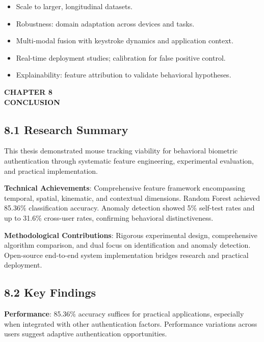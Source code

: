 \documentclass[
  11pt,
  a4paper,
]{article}
\providecommand{\tightlist}{%
  \setlength{\itemsep}{0pt}\setlength{\parskip}{0pt}}
\begin{document}
\begin{itemize}
\tightlist
\item
  Scale to larger, longitudinal datasets.
\item
  Robustness: domain adaptation across devices and tasks.
\item
  Multi-modal fusion with keystroke dynamics and application context.
\item
  Real-time deployment studies; calibration for false positive control.
\item
  Explainability: feature attribution to validate behavioral hypotheses.
\end{itemize}

\newpage
\thispagestyle{plain}

\begin{center}
\vspace*{2cm}
\textbf{\Large CHAPTER 8}\\[0.5cm]
\textbf{\Large CONCLUSION}
\end{center}

\newpage

\subsection{8.1 Research Summary}\label{research-summary}

This thesis demonstrated mouse tracking viability for behavioral
biometric authentication through systematic feature engineering,
experimental evaluation, and practical implementation.

\textbf{Technical Achievements}: Comprehensive feature framework
encompassing temporal, spatial, kinematic, and contextual dimensions.
Random Forest achieved 85.36\% classification accuracy. Anomaly
detection showed 5\% self-test rates and up to 31.6\% cross-user rates,
confirming behavioral distinctiveness.

\textbf{Methodological Contributions}: Rigorous experimental design,
comprehensive algorithm comparison, and dual focus on identification and
anomaly detection. Open-source end-to-end system implementation bridges
research and practical deployment.

\subsection{8.2 Key Findings}\label{key-findings-1}

\textbf{Performance}: 85.36\% accuracy suffices for practical
applications, especially when integrated with other authentication
factors. Performance variations across users suggest adaptive
authentication opportunities.
\end{document}

